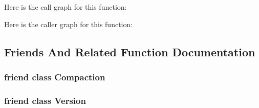 Here is the call graph for this function\-:




Here is the caller graph for this function\-:




\subsection{Friends And Related Function Documentation}
\hypertarget{classleveldb_1_1_version_set_a9372e882b35d27c78356228e4b758917}{
\subsubsection[{Compaction}]{\setlength{\rightskip}{0pt plus 5cm}friend class {\bf Compaction}\hspace{0.3cm}{\ttfamily [friend]}}}\label{classleveldb_1_1_version_set_a9372e882b35d27c78356228e4b758917}
\hypertarget{classleveldb_1_1_version_set_ace162f32d4abb584945d3a55a389b0a3}{
\subsubsection[{Version}]{\setlength{\rightskip}{0pt plus 5cm}friend class {\bf Version}\hspace{0.3cm}{\ttfamily [friend]}}}\label{classleveldb_1_1_version_set_ace162f32d4abb584945d3a55a389b0a3}


